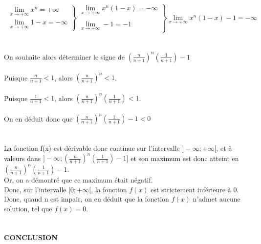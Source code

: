 \documentclass{article}
\begin{document}
\begin{exo2}
    \\ \\
    
    \[\
     \left.
        \begin{array}{ll}
            \lim\limits_{x \rightarrow +\infty} x^{n} = +\infty \\
            \lim\limits_{x \rightarrow +\infty} 1-x = -\infty
        \end{array}
    \right \} \left.
        \begin{array}{ll}
        \lim\limits_{x \rightarrow +\infty} x^{n}(1-x) = -\infty \\ \\
            \lim\limits_{x \rightarrow +\infty} -1 = -1
        \end{array}
    \right \}\lim\limits_{x \rightarrow +\infty} x^{n}(1-x) -1 = -\infty
    \] \\ \\ 
        On souhaite alors déterminer le signe de $(\frac{n}{n+1})^{n}(\frac{1}{n+1})-1$ \\ \\
        Puisque $\frac{n}{n+1}<1$, alors $(\frac{n}{n+1})^{n}<1$. \\ \\
        Puisque $\frac{1}{n+1}<1$, alors $(\frac{n}{n+1})^{n}(\frac{1}{n+1})<1$.\\ \\ 
        On en déduit donc que $(\frac{n}{n+1})^{n}(\frac{1}{n+1})-1 < 0$ \\ \\ \\
        La fonction f(x) est dérivable donc continue sur l'intervalle $]-\infty;+\infty[$, et à valeurs dans $]-\infty;(\frac{n}{n+1})^{n}(\frac{1}{n+1})-1]$ et son maximum est donc atteint en  $(\frac{n}{n+1})^{n}(\frac{1}{n+1})-1$. \\ Or, on a démontré que ce maximum était négatif. \\ Donc, sur l'intervalle $[0;+\infty[$, la fonction $f(x)$ est strictement inférieure à $0$. \\
        Donc, quand n est impair, on en déduit que la fonction $f(x)$ n'admet aucune solution, tel que $f(x) = 0$. \\ \\ \\
        
         \textbf{\large{CONCLUSION}} \\ \\ 
         

\end{exo2}
\end{document}
